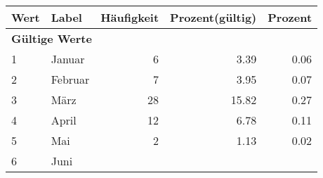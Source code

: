      \begin{longtable}{lXrrr}
     \toprule
     \textbf{Wert} & \textbf{Label} & \textbf{Häufigkeit} & \textbf{Prozent(gültig)} & \textbf{Prozent} \\
     \endhead
     \midrule
     \multicolumn{5}{l}{\textbf{Gültige Werte}}\\

     1 &
     \multicolumn{1}{X}{ Januar   } &


       \num{6} &
       \num[round-mode=places,round-precision=2]{3.39} &
         \num[round-mode=places,round-precision=2]{0.06} \\

     2 &
     \multicolumn{1}{X}{ Februar   } &


       \num{7} &
       \num[round-mode=places,round-precision=2]{3.95} &
         \num[round-mode=places,round-precision=2]{0.07} \\

     3 &
     \multicolumn{1}{X}{ März   } &


       \num{28} &
       \num[round-mode=places,round-precision=2]{15.82} &
         \num[round-mode=places,round-precision=2]{0.27} \\

     4 &
     \multicolumn{1}{X}{ April   } &


       \num{12} &
       \num[round-mode=places,round-precision=2]{6.78} &
         \num[round-mode=places,round-precision=2]{0.11} \\

     5 &
     \multicolumn{1}{X}{ Mai   } &


       \num{2} &
       \num[round-mode=places,round-precision=2]{1.13} &
         \num[round-mode=places,round-precision=2]{0.02} \\

     6 &
     \multicolumn{1}{X}{ Juni   } &



\end{longtable}
